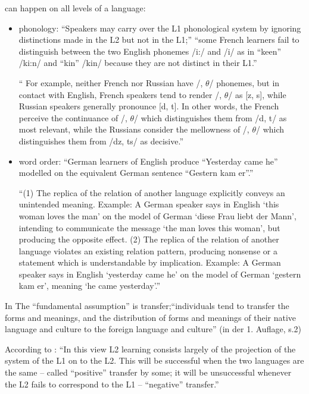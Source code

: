 can happen on all levels of a language:
\begin{itemize}
    \item phonology: ``Speakers may carry over the L1 phonological system by ignoring distinctions made in the L2 but not in the L1;'' \cite{Cook93}
        ``some French learners fail to distinguish between the two English phonemes /i:/ and /i/ as in ``keen'' /ki:n/ and ``kin'' /kin/ because they are not distinct in their L1.''

        \cite{Weinreich79} `` For example, neither French nor Russian have /, $\theta$/ phonemes, but in contact
        with English, French speakers tend to render /, $\theta$/ as [z, s], while Russian
        speakers generally pronounce [d, t].
        In other words, the French perceive the continuance of /, $\theta$/ which distinguishes them from /d, t/ as most relevant, while
        the Russians consider the mellowness of /, $\theta$/ which distinguishes them from /dz, ts/ as decisive.''


    \item word order: ``German learners of English produce ``Yesterday came he'' modelled on the equivalent German sentence ``Gestern kam er''.''

        \cite{Weinreich79} ``(1) The replica of the relation of another language explicitly conveys an unintended meaning.
        Example: A German speaker says in English `this woman loves the man' on the model of German
        `diese Frau liebt der Mann', intending to communicate the message `the man
        loves this woman', but producing the opposite effect.
        (2) The replica of the relation of another language violates an existing relation pattern, producing
        nonsense or a statement which is understandable by implication.
        Example: A German speaker says in English `yesterday came he' on the model of German
        `gestern kam er', meaning `he came yesterday'.''


\end{itemize}

In \cite{Lado71} The ``fundamental assumption'' is transfer;``individuals tend to transfer the forms and meanings, and the distribution of forms and meanings of their native language and culture to the foreign language and culture'' (in der 1. Auflage, s.2)

According to \cite{Cook93}: ``In this view L2 learning consists largely of the projection of the system of the L1 on to the L2.
This will be successful when the two languages are the same -- called ``positive'' transfer by some;
it will be unsuccessful whenever the L2 fails to correspond to the L1 -- ``negative'' transfer.''

